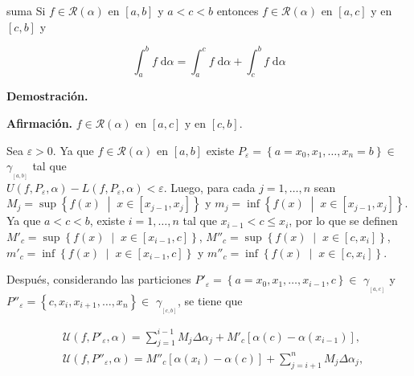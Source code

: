 \documentclass[fleqn, 12pt]{article}
\newenvironment{ejercicio}[1]{\begin{ejer}[breakable, pad at break = 5mm, leftrule = 0.7mm, rightrule = 0.7mm, right = 2mm, left = 2mm, enlarge bottom finally by = 3mm]{}{#1}}{\end{ejer}}
\newcommand{\talque}{\; \middle| \;}
\newcommand{\rsi}[1]{\mathcal{R}(#1)}
\begin{document}

	\begin{ejercicio}{suma}
		Si $ f \in \rsi{\alpha} $ en $ [a,b] $ y $ a < c < b $ entonces $ f \in \rsi{\alpha} $ en $ [a,c] $ y en $ [c,b] $ y

		\begin{equation*}
			\int_{a}^{b} f \; \mathrm{d} \alpha = \int_{a}^{c} f \; \mathrm{d} \alpha + \int_{c}^{b} f \; \mathrm{d} \alpha
		\end{equation*}

		\tcblower

		\textbf{Demostración.} \medskip

		\textbf{Afirmación.} $ f \in \rsi{\alpha} $ en $ [a,c] $ y en $ [c,b] $. \bigskip

		Sea $ \varepsilon > 0 $. Ya que $ f \in \rsi{\alpha} $ en $ [a,b] $ existe $ P_\varepsilon = \left\lbrace a = x_0, x_1, \ldots, x_n = b \right\rbrace \in $ {\large $ \gamma_{_{[a,b]}} $} tal que \\ $ U(f,P_\varepsilon,\alpha) - L(f,P_\varepsilon,\alpha) < \varepsilon $. Luego, para cada $ j = 1, \ldots, n $ sean $ M_j = \sup \left\lbrace f(x) \talque x \in \left[ x_{j-1}, x_j \right] \right\rbrace $ y $ m_j = \inf \left\lbrace f(x) \talque x \in \left[ x_{j-1}, x_j \right] \right\rbrace $. Ya que $ a < c < b $, existe $ i = 1, \ldots, n $ tal que $ x_{i-1} < c \leq x_i $, por lo que se definen $ M'_c = \sup \left\lbrace f(x) \talque x \in \left[ x_{i-1}, c \right] \right\rbrace $, $ M''_c = \sup \left\lbrace f(x) \talque x \in \left[ c, x_i \right] \right\rbrace $, $ m'_c = \inf \left\lbrace f(x) \talque x \in \left[ x_{i-1}, c \right] \right\rbrace $ y $ m''_c = \inf \left\lbrace f(x) \talque x \in \left[ c, x_i \right] \right\rbrace $. \bigskip

		Después, considerando las particiones $ P'_\varepsilon = \left\lbrace a = x_0, x_1, \ldots, x_{i-1}, c \right\rbrace \in $ {\large $ \gamma_{_{[a,c]}} $} y \\ $ P''_\varepsilon = \left\lbrace c, x_i, x_{i+1}, \ldots, x_n \right\rbrace \in $ {\large $ \gamma_{_{[c,b]}} $}, se tiene que
		
		\begin{align*}
			&\mathcal{U} \left( f, P'_\varepsilon, \alpha \right) = \sum_{j=1}^{i-1} M_j \Delta \alpha_j + M'_c \left[ \alpha(c) - \alpha\left( x_{i-1} \right) \right], \\
			&\mathcal{U} \left( f, P''_\varepsilon, \alpha \right) = M''_c \left[ \alpha(x_i) - \alpha\left( c \right) \right] + \sum_{j=i+1}^{n} M_j \Delta \alpha_j, \\
		\end{align*}
		

\end{ejercicio}
\end{document}
